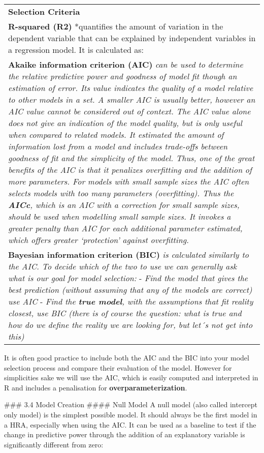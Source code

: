 \documentclass[
]{article}
\begin{document}
\begin{longtable}[]{@{}
  >{\raggedright\arraybackslash}p{}@{}}
\toprule
\endhead
\textbf{Selection Criteria} \\
\textbf{R-squared (R2)} *quantifies the amount of variation in the
dependent variable that can be explained by independent variables in a
regression model. It is calculated as:  \\
\textbf{Akaike information criterion (AIC)} \emph{can be used to
determine the relative predictive power and goodness of model fit though
an estimation of error. Its value indicates the quality of a model
relative to other models in a set. A smaller AIC is usually better,
however an AIC value cannot be considered out of context. The AIC value
alone does not give an indication of the model quality, but is only
useful when compared to related models. It estimated the amount of
information lost from a model and includes trade-offs between goodness
of fit and the simplicity of the model. Thus, one of the great benefits
of the AIC is that it penalizes overfitting and the addition of more
parameters. For models with small sample sizes the AIC often selects
models with too many parameters (overfitting). Thus the \textbf{AICc},
which is an AIC with a correction for small sample sizes, should be used
when modelling small sample sizes. It invokes a greater penalty than AIC
for each additional parameter estimated, which offers greater
`protection' against overfitting.} \\
\textbf{Bayesian information criterion (BIC)} \emph{is calculated
similarly to the AIC. To decide which of the two to use we can generally
ask what is our goal for model selection:} - \emph{Find the model that
gives the best prediction (without assuming that any of the models are
correct) use AIC} - \emph{Find the \textbf{true model}, with the
assumptions that fit reality closest, use BIC (there is of course the
question: what is true and how do we define the reality we are looking
for, but let´s not get into this)} \\
\bottomrule
\end{longtable}

It is often good practice to include both the AIC and the BIC into your
model selection process and compare their evaluation of the model.
However for simplicities sake we will use the AIC, which is easily
computed and interpreted in R and includes a penalisation for
\textbf{overparameterization}.

\#\#\# 3.4 Model Creation \#\#\#\# Null Model A null model (also called
intercept only model) is the simplest possible model. It should always
be the first model in a HRA, especially when using the AIC. It can be
used as a baseline to test if the change in predictive power through the
addition of an explanatory variable is significantly different from
zero:
\end{document}
